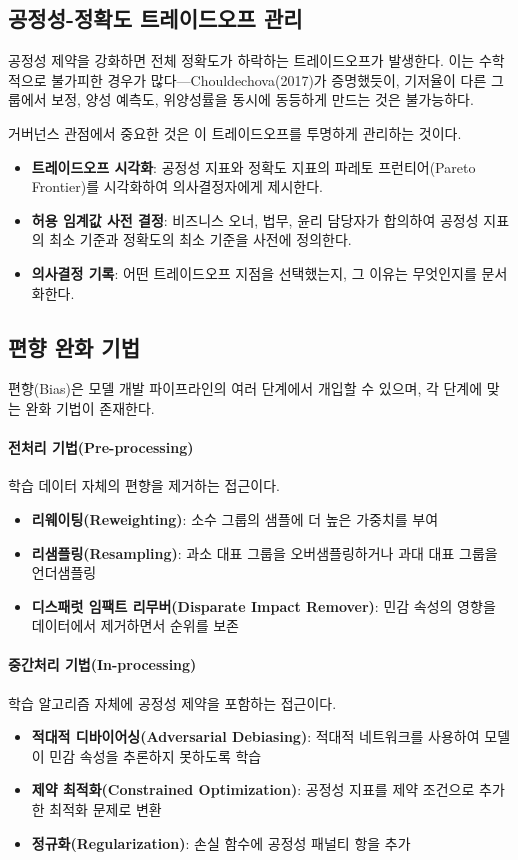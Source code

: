 \subsection{공정성-정확도 트레이드오프 관리}
\label{sec:10.3.2}

공정성 제약을 강화하면 전체 정확도가 하락하는 트레이드오프가 발생한다. 이는 수학적으로 불가피한 경우가 많다---Chouldechova(2017)가 증명했듯이, 기저율이 다른 그룹에서 보정, 양성 예측도, 위양성률을 동시에 동등하게 만드는 것은 불가능하다.

거버넌스 관점에서 중요한 것은 이 트레이드오프를 투명하게 관리하는 것이다.

\begin{itemize}
  \item \textbf{트레이드오프 시각화}: 공정성 지표와 정확도 지표의 파레토 프런티어(Pareto Frontier)를 시각화하여 의사결정자에게 제시한다.
  \item \textbf{허용 임계값 사전 결정}: 비즈니스 오너, 법무, 윤리 담당자가 합의하여 공정성 지표의 최소 기준과 정확도의 최소 기준을 사전에 정의한다.
  \item \textbf{의사결정 기록}: 어떤 트레이드오프 지점을 선택했는지, 그 이유는 무엇인지를 문서화한다.
\end{itemize}

\subsection{편향 완화 기법}
\label{sec:10.3.3}

편향(Bias)은 모델 개발 파이프라인의 여러 단계에서 개입할 수 있으며, 각 단계에 맞는 완화 기법이 존재한다.

\paragraph{전처리 기법(Pre-processing)}
학습 데이터 자체의 편향을 제거하는 접근이다.
\begin{itemize}
  \item \textbf{리웨이팅(Reweighting)}: 소수 그룹의 샘플에 더 높은 가중치를 부여
  \item \textbf{리샘플링(Resampling)}: 과소 대표 그룹을 오버샘플링하거나 과대 대표 그룹을 언더샘플링
  \item \textbf{디스패럿 임팩트 리무버(Disparate Impact Remover)}: 민감 속성의 영향을 데이터에서 제거하면서 순위를 보존
\end{itemize}

\paragraph{중간처리 기법(In-processing)}
학습 알고리즘 자체에 공정성 제약을 포함하는 접근이다.
\begin{itemize}
  \item \textbf{적대적 디바이어싱(Adversarial Debiasing)}: 적대적 네트워크를 사용하여 모델이 민감 속성을 추론하지 못하도록 학습
  \item \textbf{제약 최적화(Constrained Optimization)}: 공정성 지표를 제약 조건으로 추가한 최적화 문제로 변환
  \item \textbf{정규화(Regularization)}: 손실 함수에 공정성 패널티 항을 추가
\end{itemize}

